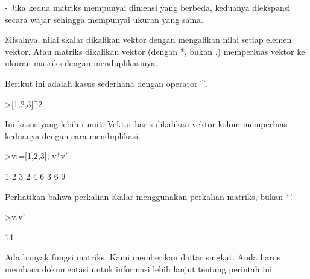 \begin{eulernotebook}
\begin{eulercomment}
\begin{eulercomment}
\begin{eulercomment}
- Jika kedua matriks mempunyai dimensi yang berbeda, keduanya
diekspansi secara wajar sehingga mempunyai ukuran yang sama.

Misalnya, nilai skalar dikalikan vektor dengan mengalikan nilai setiap
elemen vektor. Atau matriks dikalikan vektor (dengan *, bukan .)
memperluas vektor ke ukuran matriks dengan menduplikasinya.

Berikut ini adalah kasus sederhana dengan operator \textasciicircum{}.
\end{eulercomment}
\begin{eulerprompt}
>[1,2,3]^2
\end{eulerprompt}
\begin{euleroutput}
  [1,  4,  9]
\end{euleroutput}
\begin{eulercomment}
Ini kasus yang lebih rumit. Vektor baris dikalikan vektor kolom
memperluas keduanya dengan cara menduplikasi.
\end{eulercomment}
\begin{eulerprompt}
>v:=[1,2,3]; v*v'
\end{eulerprompt}
\begin{euleroutput}
              1             2             3 
              2             4             6 
              3             6             9 
\end{euleroutput}
\begin{eulercomment}
Perhatikan bahwa perkalian skalar menggunakan perkalian matriks, bukan
*!
\end{eulercomment}
\begin{eulerprompt}
>v.v'
\end{eulerprompt}
\begin{euleroutput}
  14
\end{euleroutput}
\begin{eulercomment}
Ada banyak fungsi matriks. Kami memberikan daftar singkat. Anda harus
membaca dokumentasi untuk informasi lebih lanjut tentang perintah ini.


\end{eulercomment}
\end{eulercomment}
\end{eulercomment}
\end{eulernotebook}
